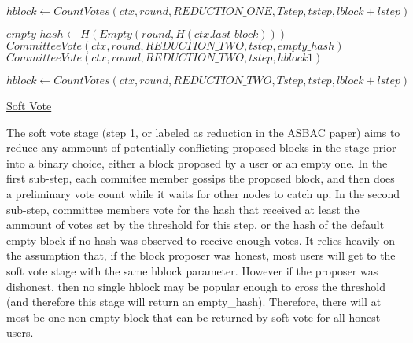 \documentclass[10pt,a4paper]{article}
\begin{document}

\begin{algorithm}
    \begin{algorithmic}[1]
    
    \State $hblock \gets CountVotes(ctx, round, REDUCTION\_ONE, Tstep, tstep, lblock+lstep)$

    \State $empty\_hash \gets H(Empty(round, H(ctx.last\_block)))$
        {\State $CommitteeVote(ctx, round, REDUCTION\_TWO, tstep, empty\_hash)$}
        {\State $CommitteeVote(ctx, round, REDUCTION\_TWO, tstep, hblock1)$}
    \EndIfThenElse

    \State $hblock \gets CountVotes(ctx, round, REDUCTION\_TWO, Tstep, tstep, lblock+lstep)$ 


    \EndFunction
    \end{algorithmic}
    \caption{\underline{Soft Vote}}
\end{algorithm}

The soft vote stage (step 1, or labeled as reduction in the ASBAC paper) aims to reduce any ammount of potentially conflicting proposed blocks in the stage prior into a binary choice, either a block proposed by a user or an empty one.
In the first sub-step, each commitee member gossips the proposed block, and then does a preliminary vote count while it waits for other nodes to catch up.
In the second sub-step, committee members vote for the hash that received at least the ammount of votes set by the threshold for this step, or the hash of the default empty block if no hash was observed to receive enough votes.
It relies heavily on the assumption that, if the block proposer was honest, most users will get to the soft vote stage with the same hblock parameter.
However if the proposer was dishonest, then no single hblock may be popular enough to cross the threshold (and therefore this stage will return an empty\_hash).
Therefore, there will at most be one non-empty block that can be returned by soft vote for all honest users.
\end{document}
